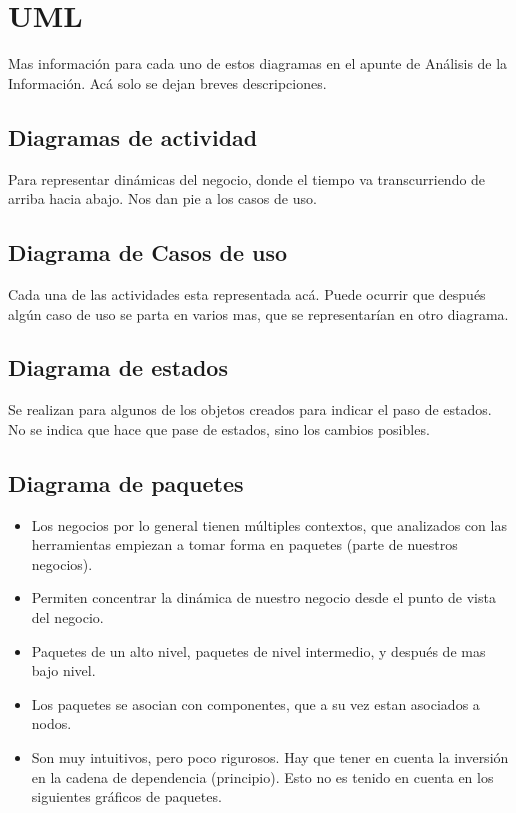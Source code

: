 \section{UML}
Mas información para cada uno de estos diagramas en el apunte de Análisis de la Información. Acá solo se dejan breves descripciones.
\subsection*{Diagramas de actividad}
Para representar dinámicas del negocio, donde el tiempo va transcurriendo de arriba hacia abajo. Nos dan pie a los casos de uso.

\subsection*{Diagrama de Casos de uso}
Cada una de las actividades esta representada acá. Puede ocurrir que después algún caso de uso se parta en varios mas, que se representarían en otro diagrama. 

\subsection*{Diagrama de estados}
Se realizan para algunos de los objetos creados para indicar el paso de estados. No se indica que hace que pase de estados, sino los cambios posibles.

\subsection*{Diagrama de paquetes}
\begin{itemize}
\item Los negocios por lo general tienen múltiples contextos, que analizados con las herramientas empiezan a tomar forma en paquetes (parte de nuestros negocios). 
\item Permiten concentrar la dinámica de nuestro negocio desde el punto de vista del negocio.
\item Paquetes de un alto nivel, paquetes de nivel intermedio, y después de mas bajo nivel.
\item Los paquetes se asocian con componentes, que a su vez estan asociados a nodos.
\item Son muy intuitivos, pero poco rigurosos. Hay que tener en cuenta la inversión en la cadena de dependencia (principio). Esto no es tenido en cuenta en los siguientes gráficos de paquetes.
\end{itemize}


